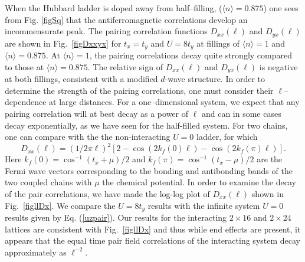 When the Hubbard ladder is doped away from half--filling,
($\langle n \rangle = 0.875$) one sees from Fig. \ref{figSq}
that the antiferromagnetic correlations develop an
incommensurate peak.
The pairing correlation functions $D_{xx}(\ell)$ and $D_{yx} (\ell)$ are
shown in Fig.\ \ref{figDxxyx} for $t_x=t_y$ and $U=8t_y$ at
fillings of $\langle n \rangle = 1$ and $\langle n \rangle = 0.875$.
At $\langle n \rangle = 1$, the pairing correlations decay quite
strongly compared to those at $\langle n \rangle = 0.875$.
The relative sign of $D_{xx}(\ell)$ and $D_{yx} (\ell)$ is negative at
both fillings, consistent with a modified $d$-wave structure.
In order to determine the strength of the pairing correlations,
one must consider their $\ell$--dependence at large distances.
For a one--dimensional system, we expect that any pairing correlation
will at best decay as a power of $\ell$ and can in some cases
decay exponentially, as we have seen for the half-filled system.
For two chains, one can compare with the
the non-interacting $U=0$ ladder, for which
\begin{equation}
D_{xx}(\ell) = ( 1/2 \pi \ell )^2
\left[ 2 - \cos ( 2 k_f(0)\ell) - \cos (2 k_f(\pi) \ell) \right].
\label{uzpair}
\end{equation}
Here $k_f(0) = \cos^{-1} (t_x+\mu)/2$ and $k_f(\pi) = \cos^{-1} (t_x-\mu)/2$
are the Fermi wave vectors corresponding to the bonding and
antibonding bands of the two coupled chains with $\mu$ the chemical
potential.
In order to examine the decay of the pair correlations, we have made
the log-log plot of $D_{xx}(\ell)$ shown in Fig.\ \ref{figllDx}.
We compare the $U = 8 t_y$ results with the infinite system $U=0$
results given by Eq. (\ref{uzpair}).
Our results for the interacting $2 \times 16$ and  $2 \times 24$
lattices are consistent
with Fig.\ \ref{figllDx} and thus while end effects are present, it
appears that
the equal time pair field correlations of the interacting system
decay approximately as $\ell^{-2}$.


